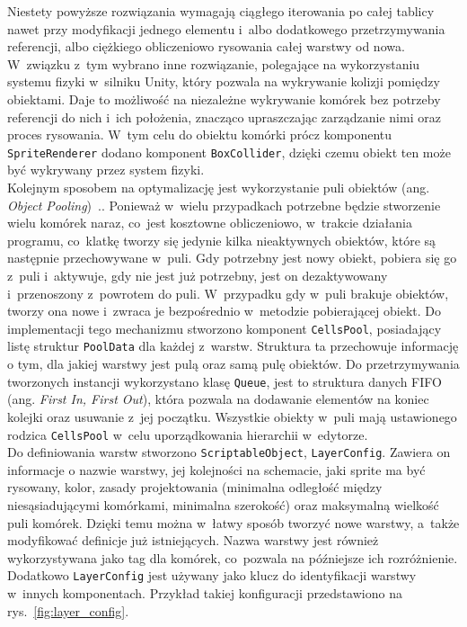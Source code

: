 Niestety powyższe rozwiązania wymagają ciągłego iterowania po całej tablicy nawet przy modyfikacji jednego elementu
i~albo dodatkowego przetrzymywania referencji, albo ciężkiego obliczeniowo rysowania całej warstwy od nowa.
W~związku z~tym wybrano inne rozwiązanie, polegające na wykorzystaniu systemu fizyki w~silniku Unity,
który pozwala na wykrywanie kolizji pomiędzy obiektami.
Daje to możliwość na niezależne wykrywanie komórek bez potrzeby referencji do nich i~ich położenia,
znacząco upraszczając zarządzanie nimi oraz proces rysowania.
W~tym celu do obiektu komórki prócz komponentu \texttt{SpriteRenderer} dodano komponent \texttt{BoxCollider},
dzięki czemu obiekt ten może być wykrywany przez system fizyki.\\
\indent Kolejnym sposobem na optymalizację jest wykorzystanie puli obiektów (ang. \textit{Object Pooling})~\cite{unity_cookbook}..
Ponieważ w~wielu przypadkach potrzebne będzie stworzenie wielu komórek naraz, co~jest kosztowne obliczeniowo,
w~trakcie działania programu, co~klatkę tworzy się jedynie kilka nieaktywnych obiektów,
które są następnie przechowywane w~puli.
Gdy potrzebny jest nowy obiekt, pobiera się go z~puli i~aktywuje, gdy nie jest już potrzebny,
jest on dezaktywowany i~przenoszony z~powrotem do puli.
W~przypadku gdy w~puli brakuje obiektów, tworzy ona nowe i~zwraca je bezpośrednio w~metodzie pobierającej obiekt.
Do implementacji tego mechanizmu stworzono komponent \texttt{CellsPool},
posiadający listę struktur \texttt{PoolData} dla każdej z~warstw.
Struktura ta przechowuje informację o tym, dla jakiej warstwy jest pulą oraz samą pulę obiektów.
Do przetrzymywania tworzonych instancji wykorzystano klasę \texttt{Queue},
jest to struktura danych FIFO (ang. \textit{First In, First Out}),
która pozwala na dodawanie elementów na koniec kolejki oraz usuwanie z~jej początku.
Wszystkie obiekty w~puli mają ustawionego rodzica \texttt{CellsPool} w~celu uporządkowania hierarchii w~edytorze.\\
\indent Do definiowania warstw stworzono \texttt{ScriptableObject}, \texttt{LayerConfig}.
Zawiera on informacje o nazwie warstwy, jej kolejności na schemacie, jaki sprite ma być rysowany, kolor,
zasady projektowania (minimalna odległość między niesąsiadującymi komórkami, minimalna szerokość)
oraz maksymalną wielkość puli komórek.
Dzięki temu można w~łatwy sposób tworzyć nowe warstwy, a~także modyfikować definicje już istniejących.
Nazwa warstwy jest również wykorzystywana jako tag dla komórek, co~pozwala na późniejsze ich rozróżnienie.
Dodatkowo \texttt{LayerConfig} jest używany jako klucz do identyfikacji warstwy w~innych komponentach.
Przykład takiej konfiguracji przedstawiono na rys.~\ref{fig:layer_config}.


